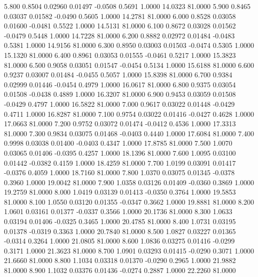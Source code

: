    5.800   0.8504   0.02960   0.01497  -0.0508   0.5691   1.0000  14.0323  81.0000
   5.900   0.8465   0.03037   0.01582  -0.0490   0.5605   1.0000  14.2781  81.0000
   6.000   0.8528   0.03058   0.01600  -0.0481   0.5522   1.0000  14.5131  81.0000
   6.100   0.8672   0.03028   0.01562  -0.0479   0.5448   1.0000  14.7228  81.0000
   6.200   0.8882   0.02972   0.01484  -0.0483   0.5381   1.0000  14.9156  81.0000
   6.300   0.8950   0.03003   0.01503  -0.0474   0.5305   1.0000  15.1320  81.0000
   6.400   0.8961   0.03053   0.01555  -0.0461   0.5217   1.0000  15.3823  81.0000
   6.500   0.9058   0.03051   0.01547  -0.0454   0.5134   1.0000  15.6188  81.0000
   6.600   0.9237   0.03007   0.01484  -0.0455   0.5057   1.0000  15.8398  81.0000
   6.700   0.9384   0.02999   0.01446  -0.0454   0.4979   1.0000  16.0617  81.0000
   6.800   0.9375   0.03054   0.01508  -0.0438   0.4889   1.0000  16.3207  81.0000
   6.900   0.9453   0.03059   0.01508  -0.0429   0.4797   1.0000  16.5822  81.0000
   7.000   0.9617   0.03022   0.01448  -0.0429   0.4711   1.0000  16.8287  81.0000
   7.100   0.9754   0.03022   0.01416  -0.0427   0.4628   1.0000  17.0663  81.0000
   7.200   0.9752   0.03072   0.01474  -0.0412   0.4536   1.0000  17.3313  81.0000
   7.300   0.9834   0.03075   0.01468  -0.0403   0.4440   1.0000  17.6084  81.0000
   7.400   0.9998   0.03038   0.01400  -0.0403   0.4347   1.0000  17.8785  81.0000
   7.500   1.0070   0.03065   0.01406  -0.0395   0.4257   1.0000  18.1396  81.0000
   7.600   1.0095   0.03100   0.01442  -0.0382   0.4159   1.0000  18.4259  81.0000
   7.700   1.0199   0.03091   0.01417  -0.0376   0.4059   1.0000  18.7160  81.0000
   7.800   1.0370   0.03075   0.01345  -0.0378   0.3960   1.0000  19.0042  81.0000
   7.900   1.0358   0.03126   0.01409  -0.0360   0.3869   1.0000  19.2759  81.0000
   8.000   1.0419   0.03139   0.01413  -0.0350   0.3764   1.0000  19.5853  81.0000
   8.100   1.0550   0.03120   0.01355  -0.0347   0.3662   1.0000  19.8881  81.0000
   8.200   1.0601   0.03161   0.01377  -0.0337   0.3566   1.0000  20.1736  81.0000
   8.300   1.0633   0.03194   0.01406  -0.0325   0.3465   1.0000  20.4785  81.0000
   8.400   1.0731   0.03195   0.01378  -0.0319   0.3363   1.0000  20.7840  81.0000
   8.500   1.0827   0.03227   0.01365  -0.0314   0.3264   1.0000  21.0805  81.0000
   8.600   1.0836   0.03275   0.01416  -0.0299   0.3171   1.0000  21.3623  81.0000
   8.700   1.0901   0.03293   0.01415  -0.0290   0.3071   1.0000  21.6660  81.0000
   8.800   1.1034   0.03318   0.01370  -0.0290   0.2965   1.0000  21.9882  81.0000
   8.900   1.1032   0.03376   0.01436  -0.0274   0.2887   1.0000  22.2260  81.0000
